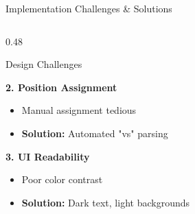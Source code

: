\documentclass[aspectratio=169]{beamer}
\begin{document}
\begin{frame}{Implementation Challenges \& Solutions}
\begin{columns}
\begin{column}{0.48\textwidth}
\begin{block}{Design Challenges}
                \vspace{0.1cm}
                
                \textbf{2. Position Assignment}
                \begin{itemize}
                    \footnotesize
                    \item Manual assignment tedious
                    \item \textbf{Solution:} Automated "vs" parsing
                \end{itemize}
                
                \vspace{0.1cm}
                
                \textbf{3. UI Readability}
                \begin{itemize}
                    \footnotesize
                    \item Poor color contrast
                    \item \textbf{Solution:} Dark text, light backgrounds
                \end{itemize}
            \end{block}
        \end{column}
    \end{columns}
\end{frame}

\end{document}
